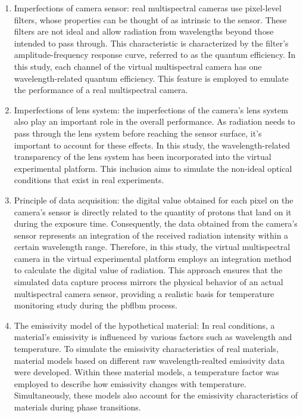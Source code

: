 \begin{enumerate}
    \item Imperfections of camera sensor: real multispectral 
    cameras use pixel-level filters, whose properties can be thought of as intrinsic to the 
    sensor. These filters are not ideal and allow radiation from wavelengths beyond those 
    intended to pass through. This characteristic is characterized by the filter's amplitude-frequency 
    response curve, referred to as the quantum efficiency. In this study, each channel of the 
    virtual multispectral camera has one wavelength-related quantum efficiency.
    This feature is employed to 
    emulate the performance of a real multispectral camera.
    
    \item Imperfections of lens system: the imperfections of the camera's lens system also
    play an important role in the overall performance. As radiation needs to pass through the lens 
    system before reaching the sensor surface, it's important to account for these effects. 
    In this study, the wavelength-related transparency of the lens system has been incorporated 
    into the virtual experimental platform. This inclusion aims to simulate the non-ideal optical 
    conditions that exist in real experiments.

    \item Principle of data acquisition: the digital value obtained for each pixel on the 
    camera's sensor is directly related to the quantity of protons that land on it during 
    the exposure time\cite{JamesC.Mullikin.1994}. Consequently, the data obtained from the 
    camera's sensor represents an integration of the received radiation intensity 
    within a certain wavelength range. Therefore, in this study, the virtual 
    multispectral camera in the virtual experimental platform employs an integration 
    method to calculate the digital value of radiation. This approach ensures that the 
    simulated data capture process mirrors the physical behavior of an actual multispectral 
    camera sensor, providing a realistic basis for temperature monitoring study during 
    the \gls{pbflbm} process.

    \item The emissivity model of the hypothetical material: In real conditions, a material's 
    emissivity is influenced by various factors such as wavelength and temperature. To simulate the 
    emissivity characteristics of real materials, material models based on different raw
    wavelength-realted emissivity data were developed. Within these material models, a temperature factor was 
    employed to describe how emissivity changes with temperature. Simultaneously, these 
    models also account for the emissivity characteristics of materials during phase transitions.

\end{enumerate}


